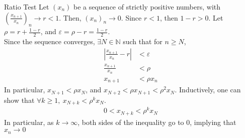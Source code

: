 \documentclass[8pt]{extarticle}
\newcommand{\N}{\mathbb{N}}
\begin{document}
  \begin{problem}{Ratio Test}
    Let $\left(x_n\right)$ be a sequence of strictly positive numbers, with $\left(\frac{x_{n+1}}{x_n}\right)_n \rightarrow r < 1$. Then, $(x_n)_n \rightarrow 0$.
    \tcblower
    Since $r < 1$, then $1-r > 0$. Let $\rho = r + \frac{1-r}{2}$, and $\varepsilon = \rho - r = \frac{1-r}{2}$.\\

    Since the sequence converges, $\exists N\in\N$ such that for $n\geq N$,
    \begin{align*}
      \left|\frac{x_{n+1}}{x_n} - r \right| &< \varepsilon\\
      \frac{x_{n+1}}{x_n} &< \rho\\
      x_{n+1} &< \rho x_n
    \end{align*}
    In particular, $x_{N+1} < \rho x_N$, and $x_{N+2} < \rho x_{N+1} < \rho^2 x_N$. Inductively, one can show that $\forall k\geq 1,~x_{N+k} < \rho^{k}x_{N}$.
    \begin{align*}
      0 < x_{N + k} < \rho^{k}x_{N}
    \end{align*}
    In particular, as $k \rightarrow \infty$, both sides of the inequality go to $0$, implying that $x_{n}\rightarrow 0$
  \end{problem}
\end{document}
